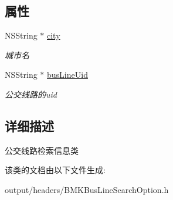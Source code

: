 \subsection*{属性}
\begin{DoxyCompactItemize}
\item 
\hypertarget{interface_b_m_k_bus_line_search_option_ac8dc465234c79e3882cddbd3e16ff21a}{}N\+S\+String $\ast$ \hyperlink{interface_b_m_k_bus_line_search_option_ac8dc465234c79e3882cddbd3e16ff21a}{city}\label{interface_b_m_k_bus_line_search_option_ac8dc465234c79e3882cddbd3e16ff21a}

\begin{DoxyCompactList}\small\item\em 城市名 \end{DoxyCompactList}\item 
\hypertarget{interface_b_m_k_bus_line_search_option_ac514e5b1930f97cecca6821562877146}{}N\+S\+String $\ast$ \hyperlink{interface_b_m_k_bus_line_search_option_ac514e5b1930f97cecca6821562877146}{bus\+Line\+Uid}\label{interface_b_m_k_bus_line_search_option_ac514e5b1930f97cecca6821562877146}

\begin{DoxyCompactList}\small\item\em 公交线路的uid \end{DoxyCompactList}\end{DoxyCompactItemize}


\subsection{详细描述}
公交线路检索信息类 

该类的文档由以下文件生成\+:\begin{DoxyCompactItemize}
\item 
output/headers/B\+M\+K\+Bus\+Line\+Search\+Option.\+h\end{DoxyCompactItemize}
